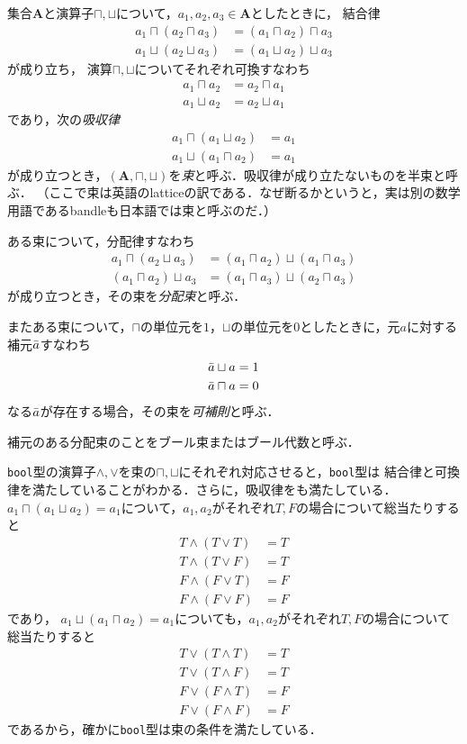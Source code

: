 \documentclass{jsbook}
\newcommand{\ccode}[1]{\texttt{#1}}
\newcommand{\keyword}[1]{\emph{#1}}
\newcommand{\bg}[1]{\mathbf{#1}}
\begin{document}
集合$\bg{A}$と演算子$\sqcap,\sqcup$について，$a_1,a_2,a_3\in\bg{A}$としたときに，
結合律
\begin{align}
a_1\sqcap(a_2\sqcap a_3)&=(a_1\sqcap a_2)\sqcap a_3\\
a_1\sqcup(a_2\sqcup a_3)&=(a_1\sqcup a_2)\sqcup a_3
\end{align}
が成り立ち，
演算$\sqcap,\sqcup$についてそれぞれ可換すなわち
\begin{align}
a_1\sqcap a_2&=a_2\sqcap a_1\\
a_1\sqcup a_2&=a_2\sqcup a_1
\end{align}
であり，次の\keyword{吸収律}
\begin{align}
a_1\sqcap(a_1\sqcup a_2)&=a_1\\
a_1\sqcup(a_1\sqcap a_2)&=a_1
\end{align}
が成り立つとき，$(\bg{A},\sqcap,\sqcup)$を\keyword{束}と呼ぶ．吸収律が成り立たないものを半束と呼ぶ．
（ここで束は英語のlatticeの訳である．なぜ断るかというと，実は別の数学用語であるbandleも日本語では束と呼ぶのだ．）

ある束について，分配律すなわち
\begin{align}
a_1\sqcap(a_2\sqcup a_3)&=(a_1\sqcap a_2)\sqcup(a_1\sqcap a_3)\\
(a_1\sqcap a_2)\sqcup a_3&=(a_1\sqcap a_3)\sqcup(a_2\sqcap a_3)
\end{align}
が成り立つとき，その束を\keyword{分配束}と呼ぶ．

またある束について，$\sqcap$の単位元を$1$，$\sqcup$の単位元を$0$としたときに，元$a$に対する補元$\Bar a$すなわち
\begin{align}
\Bar a\sqcup a&=1\\
\Bar a\sqcap a&=0
\end{align}
なる$\Bar a$が存在する場合，その束を\keyword{可補則}と呼ぶ．

補元のある分配束のことをブール束またはブール代数と呼ぶ．

\ccode{bool}型の演算子$\wedge,\vee$を束の$\sqcap,\sqcup$にそれぞれ対応させると，\ccode{bool}型は
結合律と可換律を満たしていることがわかる．さらに，吸収律をも満たしている．
$a_1\sqcap(a_1\sqcup a_2)=a_1$について，$a_1,a_2$がそれぞれ$T,F$の場合について総当たりすると
\begin{align}
T\wedge(T\vee T)&=T\\
T\wedge(T\vee F)&=T\\
F\wedge(F\vee T)&=F\\
F\wedge(F\vee F)&=F
\end{align}
であり，
$a_1\sqcup(a_1\sqcap a_2)=a_1$についても，$a_1,a_2$がそれぞれ$T,F$の場合について総当たりすると
\begin{align}
T\vee(T\wedge T)&=T\\
T\vee(T\wedge F)&=T\\
F\vee(F\wedge T)&=F\\
F\vee(F\wedge F)&=F
\end{align}
であるから，確かに\ccode{bool}型は束の条件を満たしている．
\end{document}
